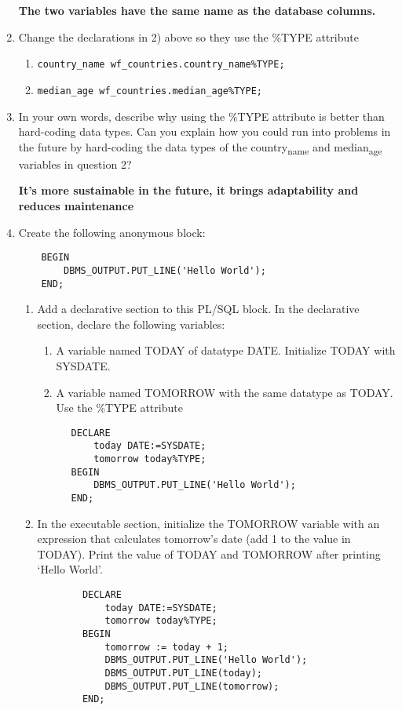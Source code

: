 \documentclass[11pt]{article}
\begin{document}
\begin{enumerate}
\textbf{The two variables have the same name as the database columns.}

\item Change the declarations in 2) above so they use the \%TYPE attribute
\begin{enumerate}
\item \texttt{country\_name wf\_countries.country\_name\%TYPE;}
\item \texttt{median\_age wf\_countries.median\_age\%TYPE;}
\end{enumerate}

\item In your own words, describe why using the \%TYPE attribute is better than hard-coding data types. Can you explain how you could run into problems in the future by hard-coding the data types of the country\textsubscript{name} and median\textsubscript{age} variables in question 2?

\textbf{It's more sustainable in the future, it brings adaptability and reduces maintenance}

\item Create the following anonymous block:
\begin{verbatim}
    BEGIN
        DBMS_OUTPUT.PUT_LINE('Hello World');
    END;
\end{verbatim}
\begin{enumerate}
\item Add a declarative section to this PL/SQL block. In the declarative section, declare the following variables:
\begin{enumerate}
\item A variable named TODAY of datatype DATE. Initialize TODAY with SYSDATE.
\item A variable named TOMORROW with the same datatype as TODAY. Use the \%TYPE attribute
\end{enumerate}
\begin{verbatim}
      DECLARE
          today DATE:=SYSDATE;
          tomorrow today%TYPE;
      BEGIN
          DBMS_OUTPUT.PUT_LINE('Hello World');
      END;
\end{verbatim}

\item In the executable section, initialize the TOMORROW variable with an expression that calculates tomorrow’s date (add 1 to the value in TODAY). Print the value of TODAY and TOMORROW after printing ‘Hello World’.
\begin{verbatim}
        DECLARE
            today DATE:=SYSDATE;
            tomorrow today%TYPE;
        BEGIN
            tomorrow := today + 1;
            DBMS_OUTPUT.PUT_LINE('Hello World');
            DBMS_OUTPUT.PUT_LINE(today);
            DBMS_OUTPUT.PUT_LINE(tomorrow);
        END;
\end{verbatim}
\end{enumerate}
\end{enumerate}
\end{document}
